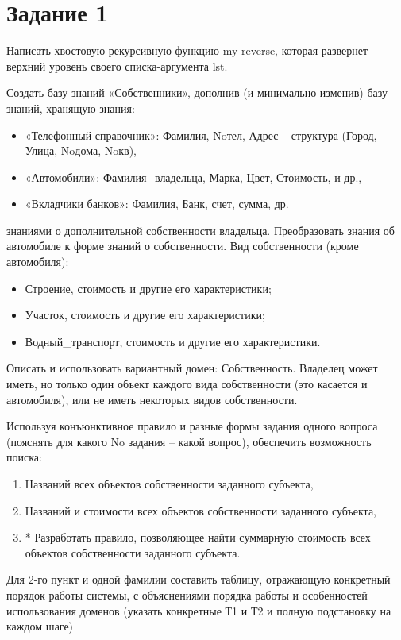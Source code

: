 \section*{Задание 1}
Написать хвостовую рекурсивную функцию my-reverse, которая развернет верхний
уровень своего списка-аргумента lst.

Создать базу знаний «Собственники», дополнив (и минимально изменив) базу знаний, хранящую знания:
\begin{itemize}
	\item «Телефонный справочник»: Фамилия, Noтел, Адрес – структура (Город, Улица, Noдома, Noкв),
	\item «Автомобили»: Фамилия\_владельца, Марка, Цвет, Стоимость, и др.,
	\item «Вкладчики банков»: Фамилия, Банк, счет, сумма, др.
\end{itemize}
знаниями о дополнительной собственности владельца. Преобразовать знания об автомобиле к форме знаний о собственности. Вид собственности (кроме автомобиля):
\begin{itemize}
	\item Строение, стоимость и другие его характеристики;
	\item Участок, стоимость и другие его характеристики;
	\item Водный\_транспорт, стоимость и другие его характеристики.
\end{itemize}

Описать и использовать вариантный домен: Собственность. Владелец может иметь, но только один объект каждого вида собственности (это касается и автомобиля), или не иметь некоторых видов собственности.

Используя конъюнктивное правило и разные формы задания одного вопроса (пояснять для какого No задания – какой вопрос), обеспечить возможность поиска:
\begin{enumerate}
	\item Названий всех объектов собственности заданного субъекта,
	\item Названий и стоимости всех объектов собственности заданного субъекта,
	\item * Разработать правило, позволяющее найти суммарную стоимость всех
	объектов собственности заданного субъекта.
\end{enumerate}

Для 2-го пункт и одной фамилии составить таблицу, отражающую конкретный
порядок работы системы, с объяснениями порядка работы и особенностей использования доменов (указать конкретные Т1 и Т2 и полную подстановку на каждом шаге)

